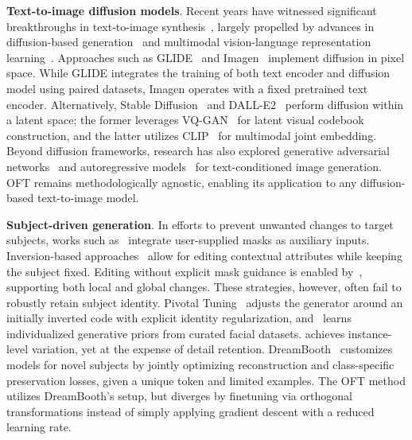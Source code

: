 \textbf{Text-to-image diffusion models}. Recent years have witnessed significant breakthroughs in text-to-image synthesis~\cite{saharia2022photorealistic,ramesh2022hierarchical,rombach2022high,gu2022vector,nichol2022glide}, largely propelled by advances in diffusion-based generation~\cite{ho2020denoising,song2021score,song2021denoising,dhariwal2021diffusion} and multimodal vision-language representation learning~\cite{su2020vlbert,lu2019vilbert,radford2021learning,wang2021simvlm,li2022blip,li2023blip,alayrac2022flamingo,schuhmann2022laion}. Approaches such as GLIDE~\cite{nichol2022glide} and Imagen~\cite{saharia2022photorealistic} implement diffusion in pixel space. While GLIDE integrates the training of both text encoder and diffusion model using paired datasets, Imagen operates with a fixed pretrained text encoder. Alternatively, Stable Diffusion~\cite{rombach2022high} and DALL-E2~\cite{ramesh2022hierarchical} perform diffusion within a latent space; the former leverages VQ-GAN~\cite{esser2021taming} for latent visual codebook construction, and the latter utilizes CLIP~\cite{radford2021learning} for multimodal joint embedding. Beyond diffusion frameworks, research has also explored generative adversarial networks~\cite{reed2016generative,zhang2017stackgan,xu2018attngan,li2019controllable} and autoregressive models~\cite{ramesh2021zero,ding2021cogview,wu2022nuwa,yuscaling} for text-conditioned image generation. OFT remains methodologically agnostic, enabling its application to any diffusion-based text-to-image model.

\textbf{Subject-driven generation}. In efforts to prevent unwanted changes to target subjects, works such as~\cite{avrahami2022blended,nichol2022glide} integrate user-supplied masks as auxiliary inputs. Inversion-based approaches~\cite{choi2021ilvr,dhariwal2021diffusion,ramesh2022hierarchical,gal2022image} allow for editing contextual attributes while keeping the subject fixed. Editing without explicit mask guidance is enabled by~\cite{hertz2022prompt}, supporting both local and global changes. These strategies, however, often fail to robustly retain subject identity. Pivotal Tuning~\cite{roich2022pivotal} adjusts the generator around an initially inverted code with explicit identity regularization, and~\cite{nitzan2022mystyle} learns individualized generative priors from curated facial datasets. \cite{casanova2021instance} achieves instance-level variation, yet at the expense of detail retention. DreamBooth~\cite{ruiz2023dreambooth} customizes models for novel subjects by jointly optimizing reconstruction and class-specific preservation losses, given a unique token and limited examples. The OFT method utilizes DreamBooth's setup, but diverges by finetuning via orthogonal transformations instead of simply applying gradient descent with a reduced learning rate.

